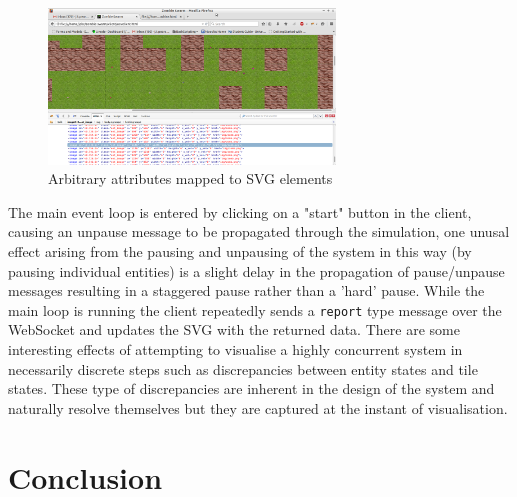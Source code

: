 \documentclass[10pt, a4paper, conference, compsocconf]{IEEEtran}
\begin{document}
\begin{figure}[h]
  \centering
  \includegraphics[width=3in]{../img/element_attributes.png}
  \caption{Arbitrary attributes mapped to SVG elements}
    \label{fig:svg_elements}
\end{figure}

The main event loop is entered by clicking on a "start" button in the client, causing an unpause message to be propagated through the simulation, one unusal effect arising from the pausing and unpausing of the system in this way (by pausing individual entities) is a slight delay in the propagation of pause/unpause messages resulting in a staggered pause rather than a 'hard' pause. While the main loop is running the client repeatedly sends a \verb+report+ type message over the WebSocket and updates the SVG with the returned data. There are some interesting effects of attempting to visualise a highly concurrent system in necessarily discrete steps such as discrepancies between entity states and tile states. These type of discrepancies are inherent in the design of the system and naturally resolve themselves but they are captured at the instant of visualisation.

\section{Conclusion}

\end{document}
